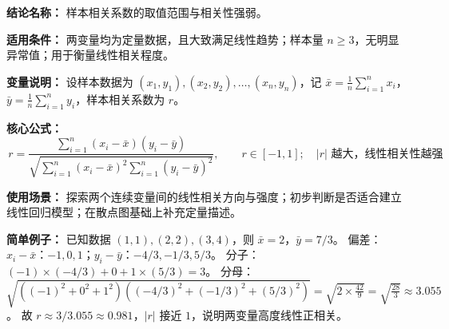 \textbf{结论名称：} 样本相关系数的取值范围与相关性强弱。

\textbf{适用条件：} 两变量均为定量数据，且大致满足线性趋势；样本量 $n\ge 3$，无明显异常值；用于衡量线性相关程度。

\textbf{变量说明：} 设样本数据为 $(x_1,y_1),(x_2,y_2),\dots,(x_n,y_n)$，记 $\bar{x}=\frac1n\sum_{i=1}^{n}x_i$，$\bar{y}=\frac1n\sum_{i=1}^{n}y_i$，样本相关系数为 $r$。

\textbf{核心公式：} 
\[
\boxed{\,r = \frac{\sum_{i=1}^{n}(x_i-\bar{x})(y_i-\bar{y})}{\sqrt{\sum_{i=1}^{n}(x_i-\bar{x})^2 \sum_{i=1}^{n}(y_i-\bar{y})^2}},\qquad r\in[-1,1];\quad |r|\text{ 越大，线性相关性越强}\,}
\]

\textbf{使用场景：} 探索两个连续变量间的线性相关方向与强度；初步判断是否适合建立线性回归模型；在散点图基础上补充定量描述。

\textbf{简单例子：} 已知数据 $(1,1),(2,2),(3,4)$，则 $\bar{x}=2$，$\bar{y}=7/3$。  
偏差：$x_i-\bar{x}$：$-1,0,1$；$y_i-\bar{y}$：$-4/3,-1/3,5/3$。  
分子：$(-1)\times(-4/3)+0+1\times(5/3)=3$。  
分母：$\sqrt{((-1)^2+0^2+1^2)((-4/3)^2+(-1/3)^2+(5/3)^2)}=\sqrt{2\times\frac{42}{9}}=\sqrt{\frac{28}{3}}\approx3.055$。  
故 $r\approx 3/3.055\approx 0.981$，$|r|$ 接近 $1$，说明两变量高度线性正相关。